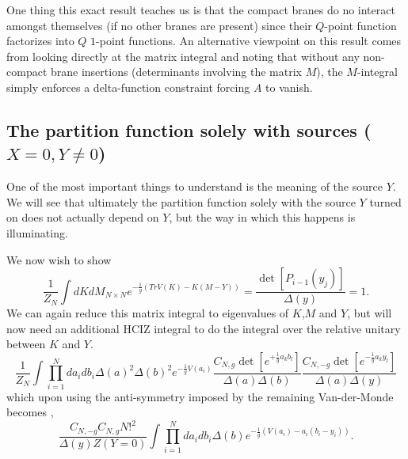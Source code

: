 \documentclass[english]{article}
\begin{document}
One thing this exact result teaches us is that the compact branes do no interact amongst themselves (if no other branes are present) since their $Q$-point function factorizes into $Q$ $1$-point functions.
An alternative viewpoint on this result comes from looking directly at the matrix integral and noting that without any non-compact brane insertions (determinants involving the matrix $M$), the $M$-integral simply enforces a delta-function constraint forcing $A$ to vanish. 


\subsection{The partition function solely with sources ($X=0,Y \neq 0$)}

One of the most important things to understand is the meaning of the source $Y$. We will see that ultimately the partition function solely with the source $Y$ turned on does not actually depend on $Y$, but the way in which this happens is illuminating. 

We now wish to show
\begin{equation}
     \frac{1}{Z_{N}}\int dK dM_{N \times N} e^{- \frac{1}{g} \left( Tr V(K) - K(M-Y) \right)} = \frac{\det \left[  P_{i-1}(y_{j})\right]}{\Delta(y)}= 1.
\end{equation}
We can again reduce this matrix integral to eigenvalues of $K$,$M$ and $Y$, but will now need an additional HCIZ integral to do the integral over the relative unitary between $K$ and $Y$.
\begin{equation}
     \frac{1}{Z_{N}} \int \prod_{i=1}^{N} da_{i} db_{i} \Delta(a)^2 \Delta(b)^2 e^{-\frac{1}{g}V(a_{i})} \frac{C_{N,g}\det\left[ e^{+\frac{1}{g} a_{k}b_{l}} \right]}{\Delta(a)\Delta(b)} \frac{C_{N,-g}\det\left[ e^{-\frac{1}{g} a_{k}y_{l}} \right]}{\Delta(a)\Delta(y)} 
\end{equation}
which upon using the anti-symmetry imposed by the remaining Van-der-Monde becomes \cite{Morozov:1995pb},
\begin{equation}
    \frac{C_{N,-g}C_{N,g}N!^2}{\Delta(y)Z(Y=0)} \int \prod_{i=1}^{N} da_{i} db_{i} \Delta(b) e^{-\frac{1}{g}\left( V(a_{i}) - a_{i}(b_{i}-y_{i}) \right)}. 
\end{equation}
\end{document}
